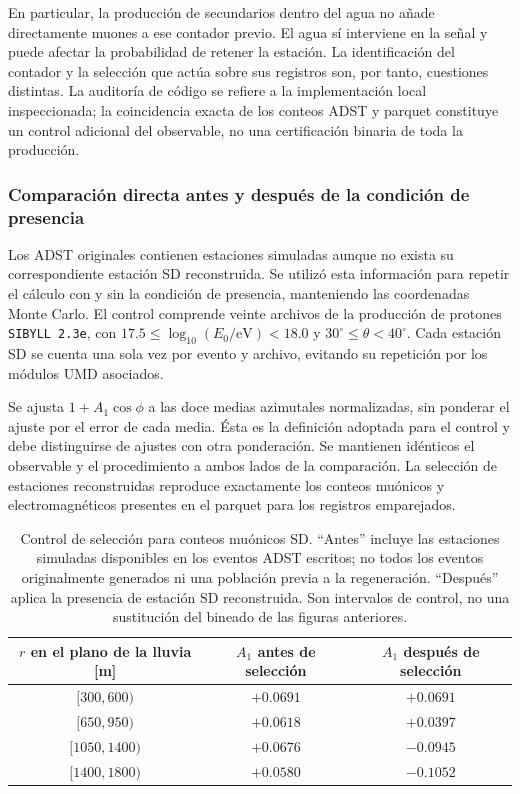 En particular, la producción de secundarios dentro del agua no añade directamente muones a ese contador previo. El agua sí interviene en la señal y puede afectar la probabilidad de retener la estación. La identificación del contador y la selección que actúa sobre sus registros son, por tanto, cuestiones distintas. La auditoría de código se refiere a la implementación local inspeccionada; la coincidencia exacta de los conteos ADST y parquet constituye un control adicional del observable, no una certificación binaria de toda la producción.

\subsubsection{Comparación directa antes y después de la condición de presencia}

Los ADST originales contienen estaciones simuladas aunque no exista su correspondiente estación SD reconstruida. Se utilizó esta información para repetir el cálculo con y sin la condición de presencia, manteniendo las coordenadas Monte Carlo. El control comprende veinte archivos de la producción de protones \texttt{SIBYLL 2.3e}, con $17.5\leq\log_{10}(E_0/\mathrm{eV})<18.0$ y $30^\circ\leq\theta<40^\circ$. Cada estación SD se cuenta una sola vez por evento y archivo, evitando su repetición por los módulos UMD asociados.

Se ajusta $1+A_1\cos\phi$ a las doce medias azimutales normalizadas, sin ponderar el ajuste por el error de cada media. Ésta es la definición adoptada para el control y debe distinguirse de ajustes con otra ponderación. Se mantienen idénticos el observable y el procedimiento a ambos lados de la comparación. La selección de estaciones reconstruidas reproduce exactamente los conteos muónicos y electromagnéticos presentes en el parquet para los registros emparejados.

\begin{table}[H]
\centering
\begin{tabular}{ccc}
\toprule
$r$ en el plano de la lluvia [m] & $A_1$ antes de selección & $A_1$ después de selección\\
\midrule
$[300,600)$   & $+0.0691$ & $+0.0691$\\
$[650,950)$   & $+0.0618$ & $+0.0397$\\
$[1050,1400)$ & $+0.0676$ & $-0.0945$\\
$[1400,1800)$ & $+0.0580$ & $-0.1052$\\
\bottomrule
\end{tabular}
\caption{Control de selección para conteos muónicos SD. ``Antes'' incluye las estaciones simuladas disponibles en los eventos ADST escritos; no todos los eventos originalmente generados ni una población previa a la regeneración. ``Después'' aplica la presencia de estación SD reconstruida. Son intervalos de control, no una sustitución del bineado de las figuras anteriores.}
\label{tab:seleccion_sd_a1}
\end{table}

